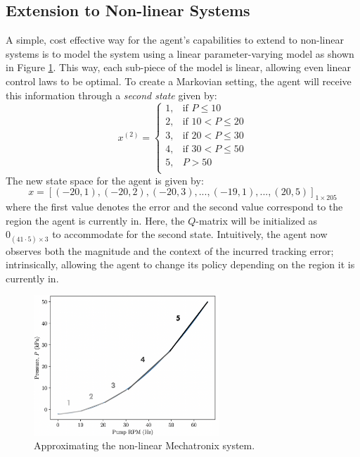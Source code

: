 \subsection{Extension to Non-linear Systems}
A simple, cost effective way for the agent's capabilities to extend to non-linear systems is to model the system using a linear parameter-varying model as shown in Figure \ref{fig:model_fit_approx}. This way, each sub-piece of the model is linear, allowing even linear control laws to be optimal.  To create a Markovian setting, the agent will receive this information through a \textit{second state} given by:
\[
    x^{(2)}= 
\begin{cases}
    1,              & \text{if } P  \leq 10 \\
    2,              & \text{if } 10 <  P  \leq 20 \\
    3,              & \text{if } 20 <  P  \leq 30 \\
    4,              & \text{if } 30 <  P  \leq 50 \\
    5,              & P > 50 \\
\end{cases}
\]
The new state space for the agent is given by:
\begin{equation}
    x = [(-20, 1), (-20, 2), (-20, 3), ..., (-19, 1), ..., (20, 5)]_{1 \times 205}
\end{equation}
where the first value denotes the error and the second value correspond to the region the agent is currently in. Here, the $Q$-matrix will be initialized as $0_{(41 \cdot 5) \times 3}$ to accommodate for the second state. Intuitively, the agent now observes both the magnitude and the context of the incurred tracking error; intrinsically, allowing the agent to change its policy depending on the region it is currently in.

\begin{figure}[H]
    \centering
    \includegraphics[width=0.62\textwidth]{images/ch4/model_fit_approx.jpeg}
    \caption{Approximating the non-linear Mechatronix system.}
    \label{fig:model_fit_approx}
\end{figure}

